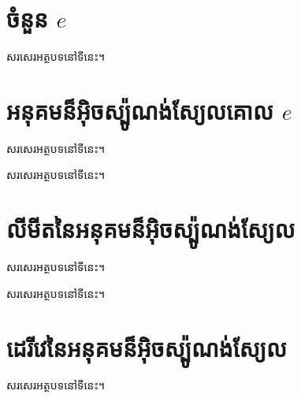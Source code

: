\documentclass[11pt,a4paper]{book}
\begin{document}
	\section{ចំនួន $ e $}
	\begin{definition}{}{}
		សរសេរអត្ថបទនៅទីនេះ។
	\end{definition}
	\section{អនុគមន៏អ៊ិចស្ប៉ូណង់ស្យែលគោល $ e $}
	\begin{definition}{}{}
		សរសេរអត្ថបទនៅទីនេះ។
	\end{definition}
	\begin{property}{}{}
		សរសេរអត្ថបទនៅទីនេះ។
	\end{property}
	\section{លីមីតនៃអនុគមន៏អ៊ិចស្ប៉ូណង់ស្យែល}
	\begin{theorem}{}{}
		សរសេរអត្ថបទនៅទីនេះ។
	\end{theorem}
	\begin{property}{}{}
		សរសេរអត្ថបទនៅទីនេះ។
	\end{property}
	\section{ដេរីវេនៃអនុគមន៏អ៊ិចស្ប៉ូណង់ស្យែល}
	\begin{property}{}{}
		សរសេរអត្ថបទនៅទីនេះ។
	\end{property}
\end{document}
